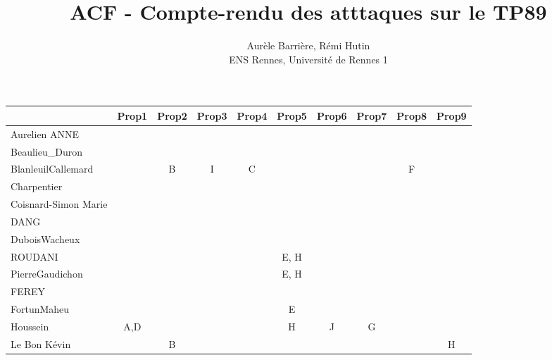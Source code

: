 \documentclass[a4paper]{article}
\begin{document}
\title{ACF - Compte-rendu des atttaques sur le TP89}
\author{Aurèle Barrière, Rémi Hutin \\ ENS Rennes, Université de Rennes 1}

\maketitle

\begin{table}[h!]
\small
\begin{tabular}{|l|c|c|c|c|c|c|c|c|c|} 
   \hline
                            & Prop1 & Prop2 & Prop3 & Prop4 & Prop5 & Prop6 & Prop7 & Prop8 & Prop9 \\ \hline \hline
    Aurelien ANNE           &       &       &       &       &       &       &       &       &       \\ \hline
    Beaulieu\_Duron         &       &       &       &       &       &       &       &       &       \\ \hline
    BlanleuilCallemard      &       & B     & I     & C     &       &       &       & F     &       \\ \hline
    Charpentier             &       &       &       &       &       &       &       &       &       \\ \hline
    Coisnard-Simon Marie    &       &       &       &       &       &       &       &       &       \\ \hline
    DANG                    &       &       &       &       &       &       &       &       &       \\ \hline
    DuboisWacheux           &       &       &       &       &       &       &       &       &       \\ \hline
    ROUDANI                 &       &       &       &       & E, H  &       &       &       &       \\ \hline
    PierreGaudichon         &       &       &       &       & E, H  &       &       &       &       \\ \hline
    FEREY                   &       &       &       &       &       &       &       &       &       \\ \hline
    FortunMaheu             &       &       &       &       & E     &       &       &       &       \\ \hline
    Houssein                & A,D   &       &       &       & H     & J     & G     &       &       \\ \hline
    Le Bon Kévin            &       & B     &       &       &       &       &       &       & H     \\ \hline

\end{tabular}
\end{table}
\end{document}
